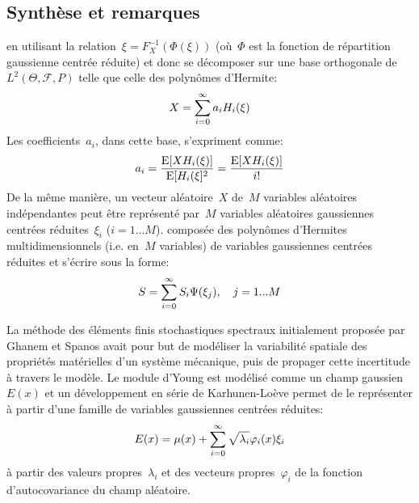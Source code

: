 \medskip
\subsection{Synthèse et remarques}

 en utilisant la relation~$\xi=F_X^{-1}(\Phi(\xi))$ (où~$\Phi$ est la fonction de répartition gaussienne centrée réduite) et donc se décomposer sur une base orthogonale de~$L^2(\Theta,\mathcal{F},P)$ telle que celle des polynômes d'Hermite:
$$X=\displaystyle\sum_{i=0}^\infty a_i H_i(\xi)$$
Les coefficients~$a_i$, dans cette base, s'expriment comme:
$$a_i=\dfrac{\operatorname{E}[XH_i(\xi)]}{\operatorname{E}[H_i(\xi]^2}=\dfrac{\operatorname{E}[XH_i(\xi)]}{i!}$$
De la même manière, un vecteur aléatoire~$X$ de~$M$ variables aléatoires indépendantes peut être représenté par~$M$ variables aléatoires gaussiennes centrées réduites~$\xi_i$ ($i=1...M$).  composée des polynômes d'Hermites multidimensionnels (i.e. en~$M$ variables) de variables gaussiennes centrées réduites et s'écrire sous la forme:
$$S=\displaystyle\sum_{i=0}^\infty S_i\Psi(\xi_j), \quad j=1...M$$

\medskip
La méthode des éléments finis stochastiques spectraux initialement proposée par Ghanem et Spanos avait pour but de modéliser la variabilité spatiale des propriétés matérielles d'un système mécanique, puis de propager cette incertitude à travers le modèle. Le module d'Young est modélisé comme un champ gaussien~$E(x)$ et un développement en série de Karhunen-Loève permet de le représenter à partir d'une famille de variables gaussiennes centrées réduites:
\begin{equation*}E(x) = \mu(x) + \displaystyle\sum_{i=0}^\infty \sqrt{\lambda_i}\varphi_i(x)\xi_i\end{equation*}
à partir des valeurs propres~$\lambda_i$ et des vecteurs propres~$\varphi_i$ de la fonction d'autocovariance du champ aléatoire. 


